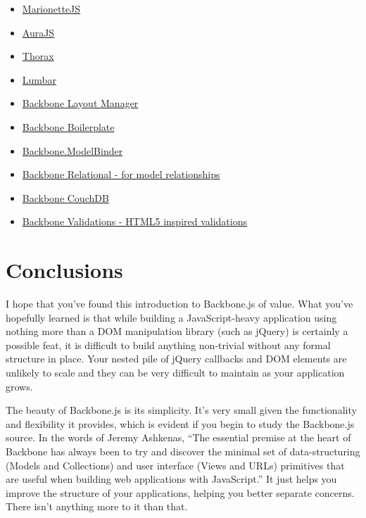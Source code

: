 \documentclass[9pt]{book}
\begin{document}
\begin{itemize}
\itemsep1pt\parskip0pt
\item
  \href{http://marionettejs.com/}{MarionetteJS}
\item
  \href{https://github.com/aurajs/aura}{AuraJS}
\item
  \href{http://thoraxjs.org}{Thorax}
\item
  \href{http://walmartlabs.github.com/lumbar}{Lumbar}
\item
  \href{https://github.com/tbranyen/backbone.layoutmanager}{Backbone
  Layout Manager}
\item
  \href{https://github.com/backbone-boilerplate/backbone-boilerplate}{Backbone
  Boilerplate}
\item
  \href{https://github.com/theironcook/Backbone.ModelBinder}{Backbone.ModelBinder}
\item
  \href{https://github.com/PaulUithol/Backbone-relational}{Backbone
  Relational - for model relationships}
\item
  \href{https://github.com/janmonschke/backbone-couchdb}{Backbone
  CouchDB}
\item
  \href{https://github.com/n-time/backbone.validations}{Backbone
  Validations - HTML5 inspired validations}
\end{itemize}

\section{Conclusions}\label{conclusions-3}

I hope that you've found this introduction to Backbone.js of value. What
you've hopefully learned is that while building a JavaScript-heavy
application using nothing more than a DOM manipulation library (such as
jQuery) is certainly a possible feat, it is difficult to build anything
non-trivial without any formal structure in place. Your nested pile of
jQuery callbacks and DOM elements are unlikely to scale and they can be
very difficult to maintain as your application grows.

The beauty of Backbone.js is its simplicity. It's very small given the
functionality and flexibility it provides, which is evident if you begin
to study the Backbone.js source. In the words of Jeremy Ashkenas, ``The
essential premise at the heart of Backbone has always been to try and
discover the minimal set of data-structuring (Models and Collections)
and user interface (Views and URLs) primitives that are useful when
building web applications with JavaScript.'' It just helps you improve
the structure of your applications, helping you better separate
concerns. There isn't anything more to it than that.
\end{document}
